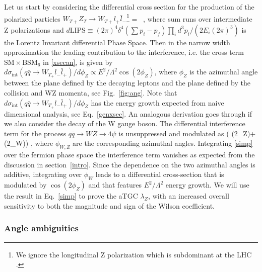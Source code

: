 \documentclass[../report.tex]{subfiles}
\begin{document}
Let us start by considering  the differential cross section for the production of the polarized particles $W_{T+} Z_T \rightarrow W_{T+}  l_+ \bar l_-$\footnote{ We ignore the  longitudinal Z polarization which is subdominant at the LHC \cite{Baur:1994ia}.}
\be
{} =
    
\,  , \label{xsecan}
\ee
where   sum runs over intermediate Z polarizations and $d\text{LIPS}\equiv (2\pi)^4\delta^4(\sum p_i -p_f) \prod_i {d^3 p_i}/\left(2 E_i(2\pi)^3\right)$ is the Lorentz Invariant differential 
Phase Space.  
%
Then in the narrow width approximation the leading contribution to the interference, i.e. the cross term $\text{SM}\times\text{BSM}_6$ in \ref{xsecan},   is given by
$
d\sigma_\text{int}(q\bar q \rightarrow W_{T_+} l_- \bar l_+)/ d\phi_Z \propto E^2/\Lambda^2 \cos(2\phi_Z) 
$, 
where  $\phi_Z$  is the azimuthal angle between the plane defined by the decaying leptons and the plane defined by the collision and WZ momenta, see Fig.~\ref{fig:ang}.  Note that $d\sigma_\text{int}(q\bar q \rightarrow W_{T_+} l_- \bar l_+)/ d\phi_Z $ has the energy growth expected from naive dimensional analysis, see  Eq.~\ref{genxsec}.
An analogous derivation goes through if we also consider the decay of the W gauge boson. The differential interference term   for the process $q\bar q\to WZ\to 4 \psi$ is  unsuppressed and modulated as
\bea
   \propto {}\left( \cos(2\phi_Z)+\cos(2\phi_W)\right) , \label{simp}
\eea
where $\phi_{W,Z}$ are the corresponding azimuthal angles. 
Integrating  \ref{simp} over the fermion phase space the   interference term vanishes as expected from the discussion in section~\ref{intro}. 
Since the dependence on the two azimuthal angles is additive, integrating  over $\phi_W$ leads to a differential cross-section that is modulated by $\cos(2\phi_Z)$ and that features $E^2/\Lambda^2$ energy growth. 
We will use the result in Eq.~\ref{simp}  to prove the aTGC $\lambda_Z$, with an increased  overall sensitivity  to both the magnitude and sign of the Wilson coefficient.


 
\subsubsection*{Angle ambiguities \cite{Panico:2017frx}} 
 
\end{document}

